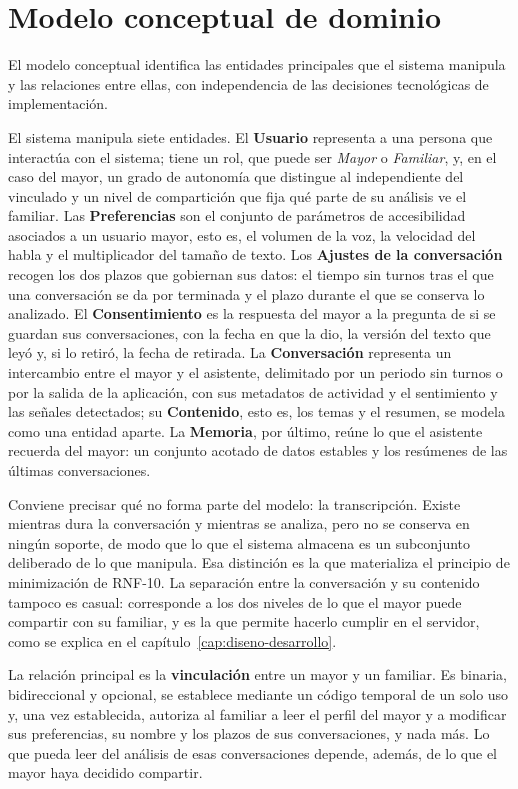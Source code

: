\section{Modelo conceptual de dominio}

El modelo conceptual identifica las entidades principales que el sistema manipula y las relaciones entre
ellas, con independencia de las decisiones tecnológicas de implementación.

El sistema manipula siete entidades. El \textbf{Usuario} representa a una persona que interactúa con el
sistema; tiene un rol, que puede ser \textit{Mayor} o \textit{Familiar}, y, en el caso del mayor, un grado
de autonomía que distingue al independiente del vinculado y un nivel de compartición que fija qué parte de
su análisis ve el familiar. Las \textbf{Preferencias} son el conjunto de parámetros de accesibilidad
asociados a un usuario mayor, esto es, el volumen de la voz, la velocidad del habla y el multiplicador del
tamaño de texto. Los \textbf{Ajustes de la conversación} recogen los dos plazos que gobiernan sus datos: el
tiempo sin turnos tras el que una conversación se da por terminada y el plazo durante el que se conserva lo
analizado. El \textbf{Consentimiento} es la respuesta del mayor a la pregunta de si se guardan sus
conversaciones, con la fecha en que la dio, la versión del texto que leyó y, si lo retiró, la fecha de
retirada. La \textbf{Conversación} representa un intercambio entre el mayor y el asistente, delimitado por
un periodo sin turnos o por la salida de la aplicación, con sus metadatos de actividad y el sentimiento y
las señales detectados; su \textbf{Contenido}, esto es, los temas y el resumen, se modela como una entidad
aparte. La \textbf{Memoria}, por último, reúne lo que el asistente recuerda del mayor: un conjunto acotado de
datos estables y los resúmenes de las últimas conversaciones.

Conviene precisar qué no forma parte del modelo: la transcripción. Existe mientras dura la conversación y
mientras se analiza, pero no se conserva en ningún soporte, de modo que lo que el sistema almacena es un
subconjunto deliberado de lo que manipula. Esa distinción es la que materializa el principio de
minimización de RNF-10. La separación entre la conversación y su contenido tampoco es casual: corresponde a
los dos niveles de lo que el mayor puede compartir con su familiar, y es la que permite hacerlo cumplir en
el servidor, como se explica en el capítulo~\ref{cap:diseno-desarrollo}.

La relación principal es la \textbf{vinculación} entre un mayor y un familiar. Es binaria, bidireccional y
opcional, se establece mediante un código temporal de un solo uso y, una vez establecida, autoriza al
familiar a leer el perfil del mayor y a modificar sus preferencias, su nombre y los plazos de sus
conversaciones, y nada más. Lo que pueda leer del análisis de esas conversaciones depende, además, de lo
que el mayor haya decidido compartir.

